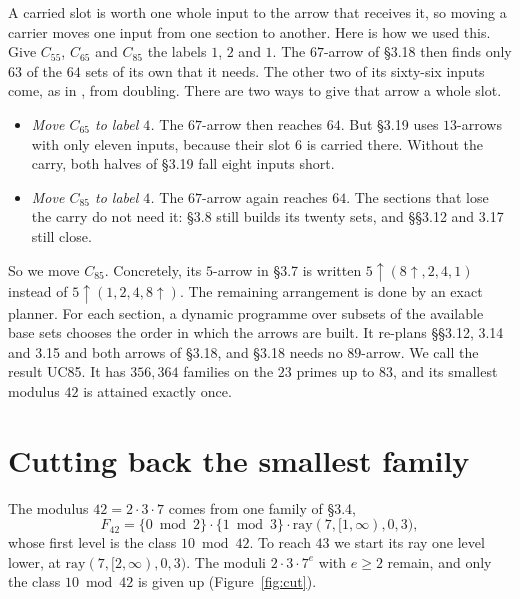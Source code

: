 \documentclass[11pt]{amsart}
\theoremstyle{definition}
\theoremstyle{remark}
\newcommand{\up}{{\uparrow}}
\newcommand{\ray}{\mathrm{ray}}
\begin{document}
A carried slot is worth one whole input to the arrow that receives it, so moving a carrier moves one input from one
section to another. Here is how we used this. Give $C_{55}$, $C_{65}$ and $C_{85}$ the labels $1$, $2$ and $1$. The $67$-arrow of §3.18
then finds only $63$ of the $64$ sets of its own that it needs. The other two of its sixty-six inputs come, as in
\cite{Owens14}, from doubling. There are two ways to give that arrow a whole slot.
\begin{itemize}
\item \emph{Move $C_{65}$ to label $4$.} The $67$-arrow then reaches $64$. But §3.19 uses $13$-arrows with only
  eleven inputs, because their slot $6$ is carried there. Without the carry, both halves of §3.19 fall eight inputs
  short.
\item \emph{Move $C_{85}$ to label $4$.} The $67$-arrow again reaches $64$. The sections that lose the carry do not
  need it: §3.8 still builds its twenty sets, and §§3.12 and 3.17 still close.
\end{itemize}
So we move $C_{85}$. Concretely, its $5$-arrow in §3.7 is written $5\up(8\up,2,4,1)$ instead of $5\up(1,2,4,8\up)$.
The remaining arrangement is done by an exact planner. For each section, a dynamic programme over subsets of the
available base sets chooses the order in which the arrows are built. It re-plans §§3.12, 3.14 and 3.15 and both
arrows of §3.18, and §3.18 needs no $89$-arrow. We call the result UC85. It has $356{,}364$ families on the $23$
primes up to $83$, and its smallest modulus $42$ is attained exactly once.

\section{Cutting back the smallest family}\label{sec:cut}

The modulus $42=2\cdot3\cdot7$ comes from one family of §3.4,
\[
F_{42} = \{0 \bmod 2\}\cdot\{1 \bmod 3\}\cdot\ray(7,[1,\infty),0,3),
\]
whose first level is the class $10 \bmod 42$. To reach $43$ we start its ray one level lower, at
$\ray(7,[2,\infty),0,3)$. The moduli $2\cdot3\cdot7^e$ with $e\ge2$ remain, and only the class $10 \bmod 42$ is
given up (Figure~\ref{fig:cut}).
\end{document}
